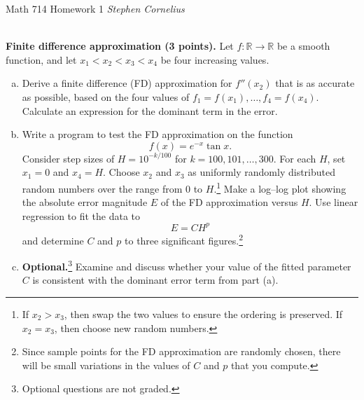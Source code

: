 \documentclass{article}
\def\R{{\mathbb R}}
\begin{document}
\begin{center}
    Math 714
    \hfill Homework 1
    \hfill \textit{Stephen Cornelius}
\end{center}


\begin{problem} \\ 
  \textbf{Finite difference approximation (3 points).}
        Let $f: \R \to \R$ be a smooth function, and let $x_1<x_2<x_3<x_4$ be
        four increasing values.
        \begin{enumerate}[(a)]
          \item Derive a finite difference (FD) approximation for $f''(x_2)$ that
                is as accurate as possible, based on the four values of $f_1=f(x_1),
                  \ldots, f_4 = f(x_4)$. Calculate an expression for the dominant term
                in the error.
          \item Write a program to test the FD approximation
                on the function
                \begin{equation}
                  f(x) = e^{-x} \tan x.
                \end{equation}
                Consider step sizes of $H=10^{-k/100}$ for $k={100,101,\ldots,300}$.
                For each $H$, set $x_1=0$ and $x_4=H$. Choose $x_2$ and $x_3$ as uniformly
                randomly distributed random numbers over the range from $0$ to
                $H$.\footnote{If $x_2>x_3$, then swap the two values to ensure the
                  ordering is preserved. If $x_2=x_3$, then choose new random numbers.}
                Make a log--log plot showing the absolute error magnitude $E$ of the FD
                approximation versus $H$. Use linear regression to fit the data to
                \begin{equation}
                  E = C H^p
                \end{equation}
                and determine $C$ and $p$ to three significant figures.\footnote{Since sample
                  points for the FD approximation are randomly chosen, there will be
                  small variations in the values of $C$ and $p$ that you compute.}
          \item \textbf{Optional.}\footnote{Optional questions are not graded.}
                Examine and discuss whether your value of the
                fitted parameter $C$ is consistent with the dominant error term from
                part (a).
        \end{enumerate}
\end{problem}
\end{document}
